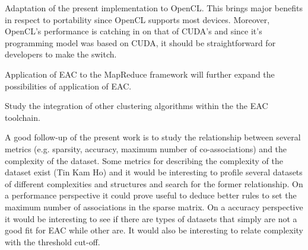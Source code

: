 Adaptation of the present implementation to OpenCL. This brings major benefits in respect to portability since OpenCL supports most devices. Moreover, OpenCL's performance is catching in on that of CUDA's and since it's programming model was based on CUDA, it should be straightforward for developers to make the switch.

Application of EAC to the MapReduce framework will further expand the possibilities of application of EAC.

Study the integration of other clustering algorithms within the the EAC toolchain.

A good follow-up of the present work is to study the relationship between several metrics (e.g. sparsity, accuracy, maximum number of co-associations) and the complexity of the dataset. Some metrics for describing the complexity of the dataset exist (Tin Kam Ho) and it would be interesting to profile several datasets of different complexities and structures and search for the former relationship.
On a performance perspective it could prove useful to deduce better rules to set the maximum number of associations in the sparse matrix.
On a accuracy perspective it would be interesting to see if there are types of datasets that simply are not a good fit for EAC while other are. It would also be interesting to relate complexity with the threshold cut-off.

\cleardoublepage

